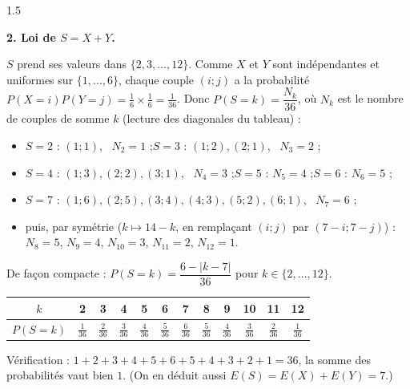 \documentclass[12pt]{article}
\begin{document}
\begin{spacing}{1.5}
\begin{center}
\end{center}

\textbf{2. Loi de $S=X+Y$.}

$S$ prend ses valeurs dans $\{2,3,\dots,12\}$. Comme $X$ et $Y$ sont indépendantes et uniformes sur $\{1,\dots,6\}$, chaque couple $(i;j)$ a la probabilité $P(X=i)P(Y=j)=\frac16\times\frac16=\frac1{36}$. Donc $P(S=k)=\dfrac{N_k}{36}$, où $N_k$ est le nombre de couples de somme $k$ (lecture des diagonales du tableau) :
\begin{itemize}
\item $S=2$ : $(1;1)$, \ $N_2=1$ ;\quad $S=3$ : $(1;2),(2;1)$, \ $N_3=2$ ;
\item $S=4$ : $(1;3),(2;2),(3;1)$, \ $N_4=3$ ;\quad $S=5$ : $N_5=4$ ;\quad $S=6$ : $N_6=5$ ;
\item $S=7$ : $(1;6),(2;5),(3;4),(4;3),(5;2),(6;1)$, \ $N_7=6$ ;
\item puis, par symétrie ($k\mapsto 14-k$, en remplaçant $(i;j)$ par $(7-i;7-j)$) : $N_8=5$, $N_9=4$, $N_{10}=3$, $N_{11}=2$, $N_{12}=1$.
\end{itemize}
De façon compacte : $P(S=k)=\dfrac{6-|k-7|}{36}$ pour $k\in\{2,\dots,12\}$.

\begin{center}
\begin{tabular}{|c|c|c|c|c|c|c|c|c|c|c|c|}
\hline
$k$ & 2 & 3 & 4 & 5 & 6 & 7 & 8 & 9 & 10 & 11 & 12 \\
\hline
$P(S=k)$ & $\frac{1}{36}$ & $\frac{2}{36}$ & $\frac{3}{36}$ & $\frac{4}{36}$ & $\frac{5}{36}$ & $\frac{6}{36}$ & $\frac{5}{36}$ & $\frac{4}{36}$ & $\frac{3}{36}$ & $\frac{2}{36}$ & $\frac{1}{36}$ \\
\hline
\end{tabular}
\end{center}
Vérification : $1+2+3+4+5+6+5+4+3+2+1=36$, la somme des probabilités vaut bien $1$. (On en déduit aussi $E(S)=E(X)+E(Y)=7$.)


\end{spacing}
\end{document}
